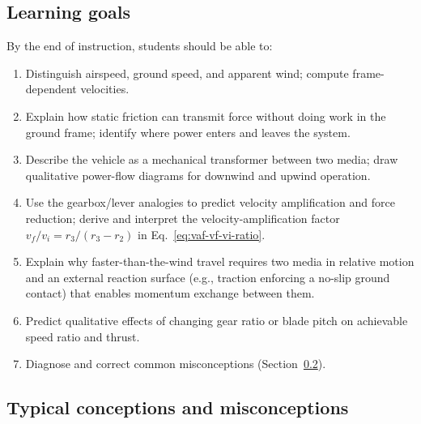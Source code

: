 \documentclass[reprint,aps,pra,longbibliography]{revtex4-2}
\begin{document}
\subsection{Learning goals}

By the end of instruction, students should be able to:
\begin{enumerate}
\item Distinguish airspeed, ground speed, and apparent wind; compute frame-dependent velocities.
\item Explain how static friction can transmit force without doing work in the ground frame; identify where power enters and leaves the system.
\item Describe the vehicle as a mechanical transformer between two media; draw qualitative power-flow diagrams for downwind and upwind operation.
\item Use the gearbox/lever analogies to predict velocity amplification and force reduction; derive and interpret the velocity-amplification factor $v_f/v_i = r_3/(r_3-r_2)$ in Eq.~\eqref{eq:vaf-vf-vi-ratio}.
\item Explain why faster-than-the-wind travel requires two media in relative motion and an external reaction surface (e.g., traction enforcing a no-slip ground contact) that enables momentum exchange between them.
\item Predict qualitative effects of changing gear ratio or blade pitch on achievable speed ratio and thrust.
\item Diagnose and correct common misconceptions (Section~\ref{sec:misconceptions}).
\end{enumerate}

\subsection{Typical conceptions and misconceptions}
\label{sec:misconceptions}
\end{document}

